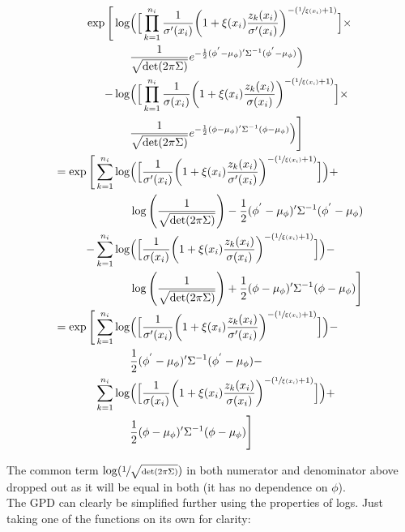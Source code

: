\documentclass{article}
\begin{document}
\begin{align*}
 \exp \Bigg[ \log & \Big( \Big[ \prod_{k=1}^{n_i} \frac{1}{\sigma'(x_i)} \bigg( 1 + \xi(x_i) \frac{z_k(x_i)}{\sigma'(x_i)} \bigg)^{-(\sfrac{1}{\xi(x_i)} + 1)} \Big] \times \\
& \frac{1}{\sqrt{\det(2 \pi \Sigma)}} e^{-\frac{1}{2} (\phi^{'} - \mu_\phi)' \Sigma^{-1} (\phi^{'} - \mu_\phi) } \Big) \\
- \log & \Big( \Big[ \prod_{k=1}^{n_i} \frac{1}{\sigma(x_i)} \bigg( 1 + \xi(x_i) \frac{z_k(x_i)}{\sigma(x_i)} \bigg)^{-(\sfrac{1}{\xi(x_i)} + 1)} \Big] \times \\
& \frac{1}{\sqrt{\det(2 \pi \Sigma)}} e^{-\frac{1}{2} (\phi - \mu_\phi)' \Sigma^{-1} (\phi - \mu_\phi) } \Big) \Bigg] \\
= \exp \Bigg[ \sum_{k=1}^{n_i} \log & \Big( \Big[ \frac{1}{\sigma'(x_i)} \bigg( 1 + \xi(x_i) \frac{z_k(x_i)}{\sigma'(x_i)} \bigg)^{-(\sfrac{1}{\xi(x_i)} + 1)} \Big] \Big) + \\
& \log \Bigg( \frac{1}{\sqrt{\det(2 \pi \Sigma)}} \Bigg) -\frac{1}{2} (\phi^{'} - \mu_\phi)' \Sigma^{-1} (\phi^{'} - \mu_\phi) \\
- \sum_{k=1}^{n_i} \log & \Big( \Big[  \frac{1}{\sigma(x_i)} \bigg( 1 + \xi(x_i) \frac{z_k(x_i)}{\sigma(x_i)} \bigg)^{-(\sfrac{1}{\xi(x_i)} + 1)} \Big] \Big) - \\
& \log \Bigg( \frac{1}{\sqrt{\det(2 \pi \Sigma)}} \Bigg) +\frac{1}{2} (\phi - \mu_\phi)' \Sigma^{-1} (\phi - \mu_\phi) \Bigg] \\
= \exp \Bigg[ \sum_{k=1}^{n_i} \log & \Big( \Big[ \frac{1}{\sigma'(x_i)} \bigg( 1 + \xi(x_i) \frac{z_k(x_i)}{\sigma'(x_i)} \bigg)^{-(\sfrac{1}{\xi(x_i)} + 1)} \Big] \Big) - \\
& \frac{1}{2} (\phi^{'} - \mu_\phi)' \Sigma^{-1} (\phi^{'} - \mu_\phi) - \\
\sum_{k=1}^{n_i} \log & \Big( \Big[  \frac{1}{\sigma(x_i)} \bigg( 1 + \xi(x_i) \frac{z_k(x_i)}{\sigma(x_i)} \bigg)^{-(\sfrac{1}{\xi(x_i)} + 1)} \Big] \Big) + \\
& \frac{1}{2} (\phi - \mu_\phi)' \Sigma^{-1} (\phi - \mu_\phi) \Bigg]
\end{align*}

The common term $\log(\sfrac{1}{\sqrt{\det(2 \pi \Sigma)}})$ in both numerator and denominator above dropped out as it will be equal in both (it has no dependence on $\phi$). \\

The GPD can clearly be simplified further using the properties of logs. Just taking one of the functions on its own for clarity:
\end{document}
